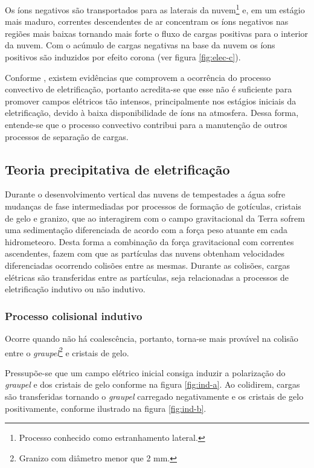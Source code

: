 Os íons negativos são transportados para as laterais da nuvem\footnote{Processo conhecido como estranhamento lateral.} e, em um estágio mais maduro, correntes descendentes de ar concentram os íons negativos nas regiões mais baixas tornando mais forte o fluxo de cargas positivas para o interior da nuvem. Com o acúmulo de cargas negativas na base da nuvem os íons positivos são induzidos por efeito corona (ver figura \ref{fig:elec-c}).

Conforme , existem evidências que comprovem a ocorrência do processo convectivo de eletrificação, portanto acredita-se que esse não é suficiente para promover campos elétricos tão intensos,  principalmente nos estágios iniciais da eletrificação, devido à baixa disponibilidade de íons na atmosfera. Dessa forma, entende-se que o processo convectivo contribui para a manutenção de outros processos de separação de cargas.

\subsection{Teoria precipitativa de eletrificação}

Durante o desenvolvimento vertical das nuvens de tempestades a água sofre mudanças de fase intermediadas por processos de formação de gotículas, cristais de gelo e granizo, que ao interagirem com o campo gravitacional da Terra sofrem uma sedimentação diferenciada de acordo com a força peso atuante em cada hidrometeoro. Desta forma a combinação da força gravitacional com  correntes ascendentes, fazem com que as partículas das nuvens obtenham velocidades diferenciadas ocorrendo colisões entre as mesmas. Durante as colisões, cargas elétricas são transferidas entre as partículas, seja relacionadas a processos de eletrificação indutivo ou não indutivo.

\subsubsection{Processo colisional indutivo} 

Ocorre quando não há coalescência, portanto, torna-se mais provável na colisão entre o \textit{graupel}\footnote{Granizo com diâmetro menor que 2 mm.} e cristais de gelo.

Pressupõe-se que um campo elétrico inicial consiga induzir a polarização do \textit{graupel} e dos cristais de gelo conforme na figura \ref{fig:ind-a}. Ao colidirem, cargas são transferidas tornando o \textit{graupel} carregado negativamente e os cristais de gelo positivamente, conforme ilustrado na figura \ref{fig:ind-b}.

